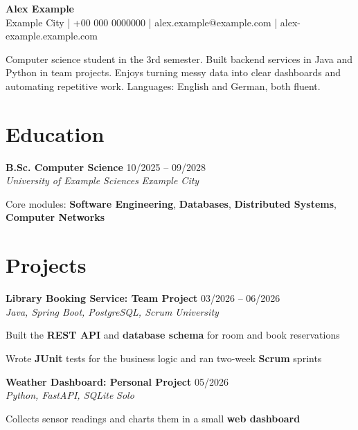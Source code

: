 \documentclass[10pt,a4paper]{article}
\let\olditemize\itemize
\let\endolditemize\enditemize
\renewenvironment{itemize}{\olditemize\RaggedRight}{\endolditemize\vspace{6pt}}
\newcommand{\cvheading}[4]{%
  \textbf{#1} \hfill #2\\
  \textit{#3} \hfill \textit{#4}\par
}
\newenvironment{cvblock}{\noindent\begin{minipage}{\linewidth}}{\end{minipage}}
\begin{document}
\begin{center}
  {\LARGE\bfseries Alex Example}\\[4pt]
  Example City \quad | \quad +00 000 0000000 \quad | \quad alex.example@example.com \quad | \quad alex-example.example.com
\end{center}

\noindent Computer science student in the 3rd semester. Built backend services in Java and Python in team projects. Enjoys turning messy data into clear dashboards and automating repetitive work. Languages: English and German, both fluent.

\section{Education}
\begin{cvblock}
\cvheading{B.Sc. Computer Science}{10/2025 -- 09/2028}{University of Example Sciences}{Example City}
\begin{itemize}
  \item Core modules: \textbf{Software Engineering}, \textbf{Databases}, \textbf{Distributed Systems}, \textbf{Computer Networks}
\end{itemize}
\end{cvblock}

\section{Projects}
\begin{cvblock}
\cvheading{Library Booking Service: Team Project}{03/2026 -- 06/2026}{Java, Spring Boot, PostgreSQL, Scrum}{University}
\begin{itemize}
  \item Built the \textbf{REST API} and \textbf{database schema} for room and book reservations
  \item Wrote \textbf{JUnit} tests for the business logic and ran two-week \textbf{Scrum} sprints
\end{itemize}
\end{cvblock}

\begin{cvblock}
\cvheading{Weather Dashboard: Personal Project}{05/2026}{Python, FastAPI, SQLite}{Solo}
\begin{itemize}
  \item Collects sensor readings and charts them in a small \textbf{web dashboard}
\end{itemize}
\end{cvblock}
\end{document}
